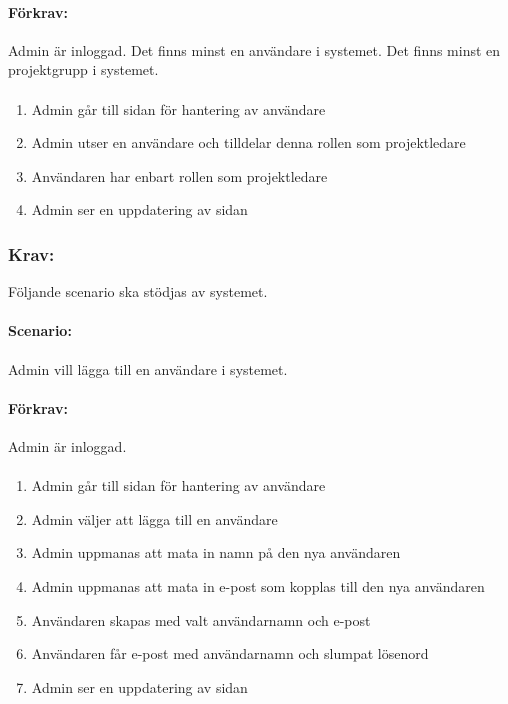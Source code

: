 \documentclass[paper=a4, fontsize=11pt,twoside]{article}
\begin{document}
	\paragraph{Förkrav:}
	Admin är inloggad. Det finns minst en användare i systemet. Det finns minst en projektgrupp i systemet.
	\paragraph{}
	\begin{enumerate}
		\item Admin går till sidan för hantering av användare
		\item Admin utser en användare och tilldelar denna rollen som projektledare
		\item Användaren har enbart rollen som projektledare
		\item Admin ser en uppdatering av sidan
	\end{enumerate}
	\newpage
	\subsubsection{Krav:} Följande scenario ska stödjas av systemet. 
	\paragraph{Scenario:}
	Admin vill lägga till en användare i systemet.
	\paragraph{Förkrav:}
	Admin är inloggad. 
	\paragraph{}
	\begin{enumerate}
		\item Admin går till sidan för hantering av användare
		\item Admin väljer att lägga till en användare
		\item Admin uppmanas att mata in namn på den nya användaren
		\item Admin uppmanas att mata in e-post som kopplas till den nya användaren
		\item Användaren skapas med valt användarnamn och e-post
		\item Användaren får e-post med användarnamn och slumpat lösenord
		\item Admin ser en uppdatering av sidan
	\end{enumerate}
	
\end{document}
